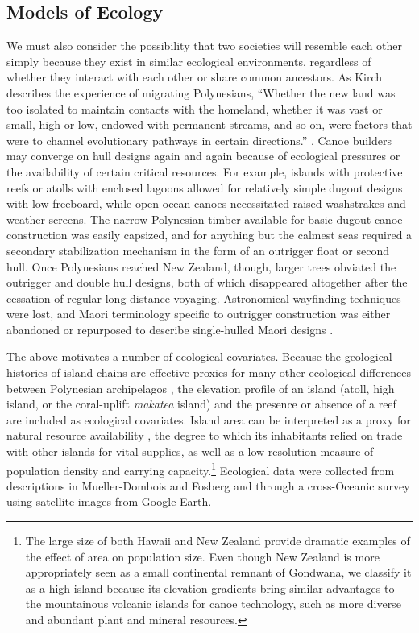     
\subsection{Models of Ecology}

    We must also consider the possibility that two societies will resemble each other simply because they exist in similar ecological environments, regardless of whether they interact with each other or share common ancestors.  As Kirch describes the experience of migrating Polynesians, ``Whether the new land was too isolated to maintain contacts with the homeland, whether it was vast or small, high or low, endowed with permanent streams, and so on, were factors that were to channel evolutionary pathways in certain directions.'' \citep{Kirch1984evolution}. Canoe builders may converge on hull designs again and again because of ecological pressures or the availability of certain critical resources.  For example, islands with protective reefs or atolls with enclosed lagoons allowed for relatively simple dugout designs with low freeboard, while open-ocean canoes necessitated raised washstrakes and weather screens.  The narrow Polynesian timber available for basic dugout canoe construction was easily capsized, and for anything but the calmest seas required a secondary stabilization mechanism in the form of an outrigger float or second hull.  Once Polynesians reached New Zealand, though, larger trees obviated the outrigger and double hull designs, both of which disappeared altogether after the cessation of regular long-distance voyaging.  Astronomical wayfinding techniques were lost, and Maori terminology specific to outrigger construction was either abandoned or repurposed to describe single-hulled Maori designs \citep{Biggs2006}.

The above motivates a number of ecological covariates.  Because the geological histories of island chains are effective proxies for many other ecological differences between Polynesian archipelagos \citep{Kirch2000:Road}, the elevation profile of an island (atoll, high island, or the coral-uplift \textit{makatea} island) and the presence or absence of a reef are included as ecological covariates.  Island area can be interpreted as a proxy for natural resource availability \citep{Banack1991ethnobotany}, the degree to which its inhabitants relied on trade with other islands for vital supplies, as well as a low-resolution measure of population density and carrying capacity.\footnote{The large size of both Hawaii and New Zealand provide dramatic examples of the effect of area on population size.  Even though New Zealand is more appropriately seen as a small continental remnant of Gondwana, we classify it as a high island because its elevation gradients bring similar advantages to the mountainous volcanic islands for canoe technology, such as more diverse and abundant plant and mineral resources.}  Ecological data were collected from descriptions in Mueller-Dombois and Fosberg \citeyearpar{Mueller1998:Vegetation} and through a cross-Oceanic survey using satellite images from Google Earth.          

